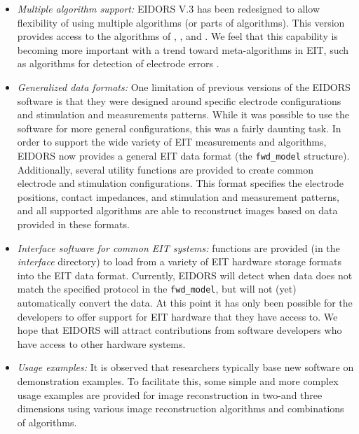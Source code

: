 \documentclass[12pt]{iopart}
\begin{document}
\begin{itemize}

  \item {\em Multiple algorithm support:}
EIDORS V.3 has been redesigned to allow flexibility of
using multiple algorithms (or parts of algorithms). 
This version provides access to the algorithms of
\cite{Adler_and_Guardo_1996}, \cite{Polydorides_and_Lionheart_2002},
\cite{Soleimani_etal_2005} and \cite{Vauhkonen_etal_2000}.
We feel that this capability is becoming more
important with a trend toward meta-algorithms
in EIT, such as algorithms for detection of
electrode errors \cite{Asfaw_and_Adler_2005}. 

  \item {\em Generalized data formats:}
One limitation of previous versions of the EIDORS software
is that they were designed around specific electrode configurations
and stimulation and measurements patterns. While it was possible
to use the software for more general configurations, this was 
a fairly daunting task. In order to support the wide
variety of EIT measurements and algorithms, EIDORS now provides
a general EIT data format (the {\tt fwd\_model} structure).
Additionally, several utility functions are provided to
create common electrode and stimulation configurations.
This format specifies the electrode positions, contact impedances,
and stimulation and measurement patterns, and all supported
algorithms are able to reconstruct images based on data
provided in these formats.

  \item {\em Interface software for common EIT systems:}
functions are provided (in the {\em interface} directory) to load
from a variety of EIT hardware storage formats into the
EIT data format. Currently, EIDORS will detect when data
does not match the specified protocol in the {\tt fwd\_model},
but will not (yet) automatically convert the data.
At this point it has only been possible for the developers to 
offer support for EIT hardware that they have access
to. We hope that EIDORS will attract contributions from
software developers who have access to other hardware
systems.

  \item {\em Usage examples:}
It is observed that researchers typically base new software on
demonstration examples. To facilitate this, some simple and more
complex usage examples are provided for image reconstruction
in two-and three dimensions using various image reconstruction
algorithms and combinations of algorithms.


\end{itemize}
\end{document}
